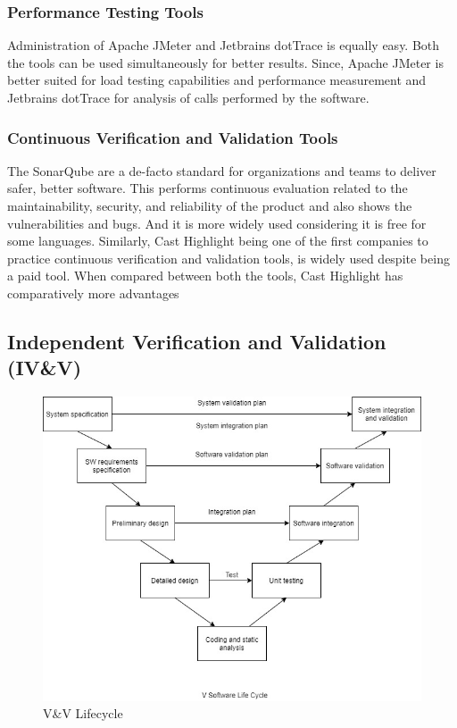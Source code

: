 \documentclass[journal, onecolumn]{IEEEtran}
\begin{document}
	\subsubsection{Performance Testing Tools}
	Administration of Apache JMeter and Jetbrains dotTrace is equally easy. Both the tools can be used simultaneously for better results. Since, Apache JMeter is better suited for load testing capabilities and performance measurement and Jetbrains dotTrace for analysis of calls performed by the software.
	\bigskip
	
	\subsubsection{Continuous Verification and Validation Tools}
	The SonarQube are a de-facto standard for organizations and teams to deliver safer, better software. This performs continuous evaluation related to the maintainability, security, and reliability of the product and also shows the vulnerabilities and bugs. And it is more widely used considering it is free for some languages.
	Similarly, Cast Highlight being one of the first companies to practice continuous verification and validation tools, is widely used despite being a paid tool. When compared between both the tools, Cast Highlight has comparatively more advantages
	\bigskip
	
	\subsection{Independent Verification and Validation (IV\&V)}
	\bigskip
	\begin{figure}[H]
		\includegraphics[scale=0.3]{lifecycle.jpg}
		\centering
		\caption{V\&V Lifecycle}
	\end{figure}
	
\end{document}
